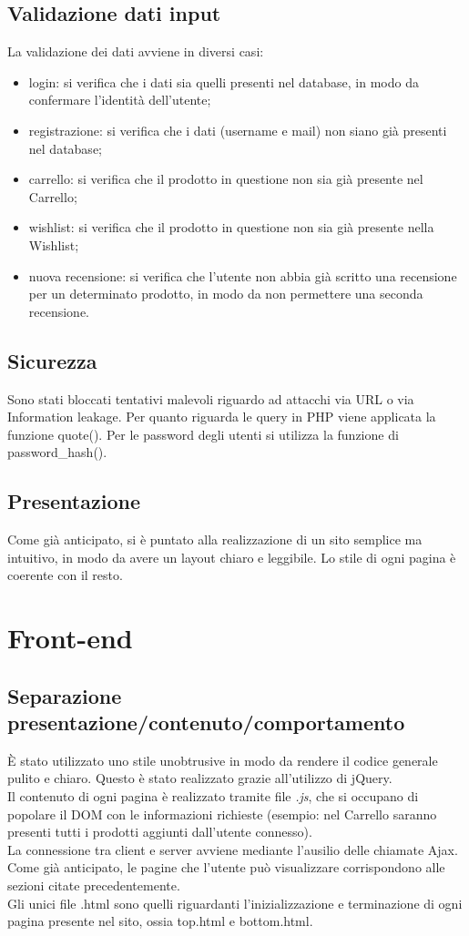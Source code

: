 \documentclass[12pt]{extarticle}
\begin{document}
\subsection{Validazione dati input}
La validazione dei dati avviene in diversi casi:
\begin{itemize}
    \item login: si verifica che i dati sia quelli presenti nel database, in modo da confermare l'identità dell'utente; 
    \item registrazione: si verifica che i dati (username e mail) non siano già presenti nel database;
    \item carrello: si verifica che il prodotto in questione non sia già presente nel Carrello;
    \item wishlist: si verifica che il prodotto in questione non sia già presente nella Wishlist;
    \item nuova recensione: si verifica che l'utente non abbia già scritto una recensione per un determinato prodotto, in modo da non permettere una seconda recensione.
\end{itemize}

\subsection{Sicurezza}
Sono stati bloccati tentativi malevoli riguardo ad attacchi via URL o via Information leakage.
Per quanto riguarda le query in PHP viene applicata la funzione quote(). Per le password degli
utenti si utilizza la funzione di password\_hash().

\subsection{Presentazione}
Come già anticipato, si è puntato alla realizzazione di un sito semplice ma intuitivo, in modo da
avere un layout chiaro e leggibile. Lo stile di ogni pagina è coerente con il resto.


\section{Front-end}
\subsection{Separazione presentazione/contenuto/comportamento}
È stato utilizzato uno stile unobtrusive in modo da rendere il codice generale pulito e chiaro.
Questo è stato realizzato grazie all'utilizzo di jQuery.
\\
Il contenuto di ogni pagina è realizzato tramite file \textit{.js}, che si occupano di popolare il DOM con le
informazioni richieste (esempio: nel Carrello saranno presenti tutti i prodotti aggiunti dall'utente
connesso).
\\
La connessione tra client e server avviene mediante l'ausilio delle chiamate Ajax.
Come già anticipato, le pagine che l’utente può visualizzare corrispondono alle sezioni citate
precedentemente.
\\
Gli unici file .html sono quelli riguardanti l'inizializzazione e terminazione di ogni pagina presente
nel sito, ossia top.html e bottom.html.
\end{document}
